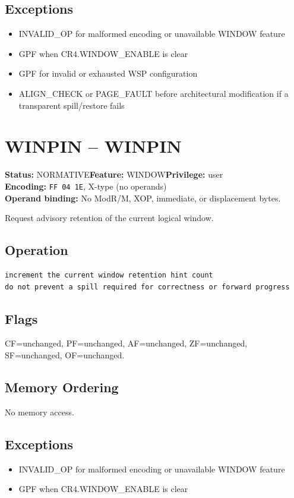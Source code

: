 \documentclass[10pt]{article}
\begin{document}
\subsection*{Exceptions}
\begin{itemize}
\item INVALID\_OP for malformed encoding or unavailable WINDOW feature
\item GPF when CR4.WINDOW\_ENABLE is clear
\item GPF for invalid or exhausted WSP configuration
\item ALIGN\_CHECK or PAGE\_FAULT before architectural modification if a transparent spill/restore fails
\end{itemize}
\clearpage

\section{WINPIN -- WINPIN}
\textbf{Status:} NORMATIVE\quad \textbf{Feature:} WINDOW\quad \textbf{Privilege:} user\\
\textbf{Encoding:} \texttt{FF 04 1E}, X-type (no operands)\\
\textbf{Operand binding:} No ModR/M, XOP, immediate, or displacement bytes.

Request advisory retention of the current logical window.

\subsection*{Operation}
\begin{lstlisting}
increment the current window retention hint count
do not prevent a spill required for correctness or forward progress
\end{lstlisting}
\subsection*{Flags}
CF=unchanged, PF=unchanged, AF=unchanged, ZF=unchanged, SF=unchanged, OF=unchanged.
\subsection*{Memory Ordering}
No memory access.
\subsection*{Exceptions}
\begin{itemize}
\item INVALID\_OP for malformed encoding or unavailable WINDOW feature
\item GPF when CR4.WINDOW\_ENABLE is clear
\end{itemize}
\clearpage
\end{document}
